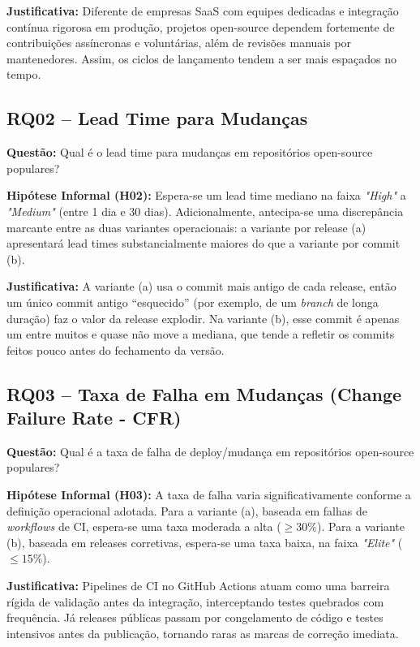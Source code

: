 \documentclass[12pt]{article}
\begin{document}
\textbf{Justificativa:} Diferente de empresas SaaS com equipes dedicadas e integração contínua rigorosa em produção, projetos open-source dependem fortemente de contribuições assíncronas e voluntárias, além de revisões manuais por mantenedores. Assim, os ciclos de lançamento tendem a ser mais espaçados no tempo.

\subsection{RQ02 -- Lead Time para Mudanças}
\textbf{Questão:} Qual é o lead time para mudanças em repositórios open-source populares?

\textbf{Hipótese Informal (H02):} Espera-se um lead time mediano na faixa \textit{"High"} a \textit{"Medium"} (entre 1 dia e 30 dias). Adicionalmente, antecipa-se uma discrepância marcante entre as duas variantes operacionais: a variante por release (a) apresentará lead times substancialmente maiores do que a variante por commit (b).

\textbf{Justificativa:} A variante (a) usa o commit mais antigo de cada release, então um único commit antigo ``esquecido'' (por exemplo, de um \textit{branch} de longa duração) faz o valor da release explodir. Na variante (b), esse commit é apenas um entre muitos e quase não move a mediana, que tende a refletir os commits feitos pouco antes do fechamento da versão.

\subsection{RQ03 -- Taxa de Falha em Mudanças (Change Failure Rate - CFR)}
\textbf{Questão:} Qual é a taxa de falha de deploy/mudança em repositórios open-source populares?

\textbf{Hipótese Informal (H03):} A taxa de falha varia significativamente conforme a definição operacional adotada. Para a variante (a), baseada em falhas de \textit{workflows} de CI, espera-se uma taxa moderada a alta ($\ge 30\%$). Para a variante (b), baseada em releases corretivas, espera-se uma taxa baixa, na faixa \textit{"Elite"} ($\le 15\%$).

\textbf{Justificativa:} Pipelines de CI no GitHub Actions atuam como uma barreira rígida de validação antes da integração, interceptando testes quebrados com frequência. Já releases públicas passam por congelamento de código e testes intensivos antes da publicação, tornando raras as marcas de correção imediata.
\end{document}
